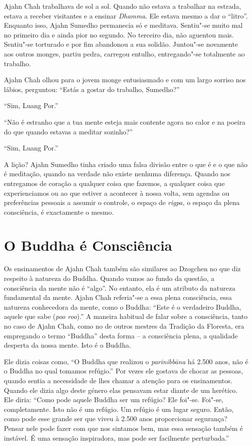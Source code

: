 Ajahn Chah trabalhava de sol a sol. Quando não estava a trabalhar na
estrada, estava a receber visitantes e a ensinar \emph{Dhamma}. Ele
estava mesmo a dar o ``litro''. Enquanto isso, Ajahn Sumedho permanecia
só e meditava. Sentiu"-se muito mal no primeiro dia e ainda pior no
segundo. No terceiro dia, não aguentou mais. Sentiu"-se torturado e por
fim abandonou a sua solidão. Juntou"-se novamente aos outros monges,
partiu pedra, carregou entulho, entregando"-se totalmente ao trabalho. 

Ajahn Chah olhou para o jovem monge entusiasmado e com um largo sorriso
nos lábios, perguntou: ``Estás a gostar do trabalho, Sumedho?''

``Sim, Luang Por.''

``Não é estranho que a tua mente esteja mais contente agora no calor e
na poeira do que quando estavas a meditar sozinho?''

``Sim, Luang Por.''

A lição? Ajahn Sumedho tinha criado uma falsa divisão entre o que é e o
que não é meditação, quando na verdade não existe nenhuma diferença.
Quando nos entregamos de coração a qualquer coisa que fazemos, a
qualquer coisa que experienciamos ou ao que estiver a acontecer à nossa
volta, sem agendas ou preferências pessoais a assumir o controle, o
espaço de  \emph{rigpa, }o espaço da plena consciência, é exactamente o
mesmo.

\section{O Buddha é Consciência}

Os ensinamentos de Ajahn Chah também são similares ao Dzogchen no que
diz respeito à natureza do Buddha. Quando vamos ao fundo da questão, a
consciência da mente não é ``algo''. No entanto, ela é um atributo da
natureza fundamental da mente. Ajahn Chah referia"-se a essa plena
consciência, essa natureza conhecedora da mente, como o Buddha: ``Este é
o verdadeiro Buddha, aquele que sabe (\emph{poo roo}).'' A maneira
habitual de falar sobre a consciência, tanto no caso de Ajahn Chah, como
no de outros mestres da Tradição da Floresta, era empregando o termo
``Buddha'' desta forma -- a consciência plena, a qualidade desperta da
nossa mente. Isto é o Buddha.

Ele dizia coisas como, ``O Buddha que realizou o \emph{parinibbāna} há
2.500 anos, não é o Buddha no qual tomamos refúgio.'' Por vezes ele
gostava de chocar as pessoas, quando sentia a necessidade de lhes chamar
a atenção para os ensinamentos. Quando ele dizia algo deste género elas
pensavam estar diante de um herético. Ele diria: ``Como pode aquele
Buddha ser um refúgio? Ele foi"-se. Foi"-se, completamente. Isto não é um
refúgio. Um refúgio é um lugar seguro. Então, como pode esse grande ser
que viveu à 2.500 anos proporcionar segurança? Pensar nele pode fazer
com que nos sintamos bem, mas essa sensação também é instável. É uma
sensação inspiradora, mas pode ser facilmente perturbada.''

